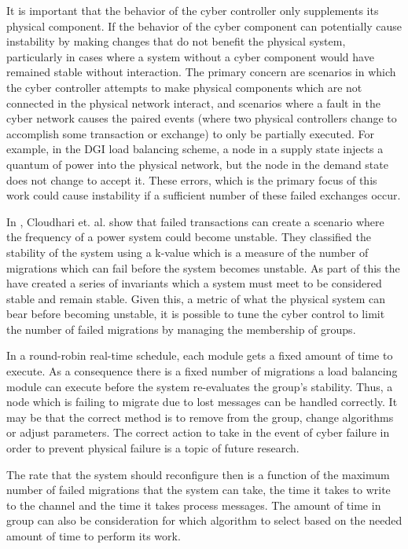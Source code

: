 It is important that the behavior of the cyber controller only supplements its physical component. If the behavior of the cyber component can potentially cause instability by making changes that do not benefit the physical system, particularly in cases where a system without a cyber component would have remained stable without interaction.
The primary concern are scenarios in which the cyber controller attempts to make physical components which are not connected in the physical network interact, and scenarios where a fault in the cyber network causes the paired events (where two physical controllers change to accomplish some transaction or exchange) to only be partially executed. For example, in the DGI load balancing scheme, a node in a supply state injects a quantum of power into the physical network, but the node in the demand state does not change to accept it. These errors, which is the primary focus of this work could cause instability if a sufficient number of these failed exchanges occur.

In \cite{HARINI}, Cloudhari et. al. show that failed transactions can create a scenario where the frequency of a power system could become unstable. They classified the stability of the system using a k-value which is a measure of the number of migrations which can fail before the system becomes unstable. As part of this the have created a series of invariants which a system must meet to be considered stable and remain stable. Given this, a metric of what the physical system can bear before becoming unstable, it is possible to tune the cyber control to limit the number of failed migrations by managing the membership of groups.

In a round-robin real-time schedule, each module gets a fixed amount of time to execute. As a consequence there is a fixed number of migrations a load balancing module can execute before the system re-evaluates the group's stability. Thus, a node which is failing to migrate due to lost messages can be handled correctly. It may be that the correct method is to remove from the group, change algorithms or adjust parameters. The correct action to take in the event of cyber failure in order to prevent physical failure is a topic of future research.

The rate that the system should reconfigure then is a function of the maximum number of failed migrations that the system can take, the time it takes to write to the channel and the time it takes process messages. The amount of time in group can also be consideration for which algorithm to select based on the needed amount of time to perform its work.

